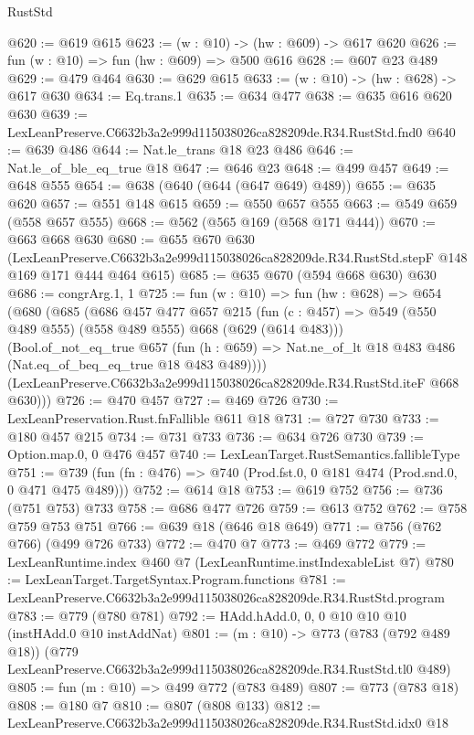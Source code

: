 \begin{lexlean}{RustStd}
\begin{coremodule}
@620 := @619 @615
@623 := (w : @10) -> (hw : @609) -> @617 @620
@626 := fun (w : @10) => fun (hw : @609) => @500 @616
@628 := @607 @23 @489
@629 := @479 @464
@630 := @629 @615
@633 := (w : @10) -> (hw : @628) -> @617 @630
@634 := Eq.trans.{1}
@635 := @634 @477
@638 := @635 @616 @620 @630
@639 := LexLeanPreserve.C6632b3a2e999d115038026ca828209de.R34.RustStd.fnd0
@640 := @639 @486
@644 := Nat.le_trans @18 @23 @486
@646 := Nat.le_of_ble_eq_true @18
@647 := @646 @23
@648 := @499 @457
@649 := @648 @555
@654 := @638 (@640 (@644 (@647 @649) @489))
@655 := @635 @620
@657 := @551 @148 @615
@659 := @550 @657 @555
@663 := @549 @659 (@558 @657 @555)
@668 := @562 (@565 @169 (@568 @171 @444))
@670 := @663 @668 @630
@680 := @655
    @670
    @630
    (LexLeanPreserve.C6632b3a2e999d115038026ca828209de.R34.RustStd.stepF
      @148
      @169
      @171
      @444
      @464
      @615)
@685 := @635 @670 (@594 @668 @630) @630
@686 := congrArg.{1, 1}
@725 := fun (w : @10) =>
  fun (hw : @628) =>
  @654
    (@680
      (@685
        (@686
          @457
          @477
          @657
          @215
          (fun (c : @457) => @549 (@550 @489 @555) (@558 @489 @555) @668 (@629 (@614 @483)))
          (Bool.of_not_eq_true
            @657
            (fun (h : @659) => Nat.ne_of_lt @18 @483 @486 (Nat.eq_of_beq_eq_true @18 @483 @489))))
        (LexLeanPreserve.C6632b3a2e999d115038026ca828209de.R34.RustStd.iteF @668 @630)))
@726 := @470 @457
@727 := @469 @726
@730 := LexLeanPreservation.Rust.fnFallible @611 @18
@731 := @727 @730
@733 := @180 @457 @215
@734 := @731 @733
@736 := @634 @726 @730
@739 := Option.map.{0, 0} @476 @457
@740 := LexLeanTarget.RustSemantics.fallibleType
@751 := @739 (fun (fn : @476) => @740 (Prod.fst.{0, 0} @181 @474 (Prod.snd.{0, 0} @471 @475 @489)))
@752 := @614 @18
@753 := @619 @752
@756 := @736 (@751 @753) @733
@758 := @686 @477 @726
@759 := @613 @752
@762 := @758 @759 @753 @751
@766 := @639 @18 (@646 @18 @649)
@771 := @756 (@762 @766) (@499 @726 @733)
@772 := @470 @7
@773 := @469 @772
@779 := LexLeanRuntime.index @460 @7 (LexLeanRuntime.instIndexableList @7)
@780 := LexLeanTarget.TargetSyntax.Program.functions
@781 := LexLeanPreserve.C6632b3a2e999d115038026ca828209de.R34.RustStd.program
@783 := @779 (@780 @781)
@792 := HAdd.hAdd.{0, 0, 0} @10 @10 @10 (instHAdd.{0} @10 instAddNat)
@801 := (m : @10) ->
  @773
    (@783 (@792 @489 @18))
    (@779 LexLeanPreserve.C6632b3a2e999d115038026ca828209de.R34.RustStd.tl0 @489)
@805 := fun (m : @10) => @499 @772 (@783 @489)
@807 := @773 (@783 @18)
@808 := @180 @7
@810 := @807 (@808 @133)
@812 := LexLeanPreserve.C6632b3a2e999d115038026ca828209de.R34.RustStd.idx0 @18

\end{coremodule}
\end{lexlean}
